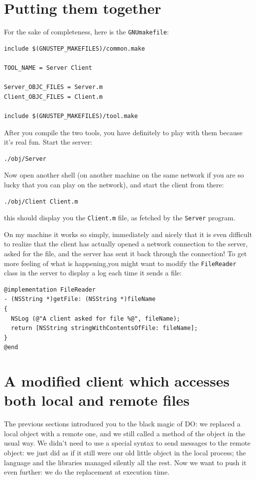 \documentclass[a4paper]{article}
\begin{document}
\section{Putting them together}
For the sake of completeness, here is the \texttt{GNUmakefile}:
\begin{verbatim}
include $(GNUSTEP_MAKEFILES)/common.make

TOOL_NAME = Server Client

Server_OBJC_FILES = Server.m
Client_OBJC_FILES = Client.m

include $(GNUSTEP_MAKEFILES)/tool.make
\end{verbatim}
After you compile the two tools, you have definitely to play with them
because it's real fun.  Start the server:
\begin{verbatim}
./obj/Server
\end{verbatim}
Now open another shell (on another machine on the same network if you
are so lucky that you can play on the network), and start the client
from there:
\begin{verbatim}
./obj/Client Client.m
\end{verbatim}
this should display you the \texttt{Client.m} file, as fetched by the
\texttt{Server} program.

On my machine it works so simply, immediately and nicely that it is
even difficult to realize that the client has actually opened a
network connection to the server, asked for the file, and the server
has sent it back through the connection!  To get more feeling of what
is happening,you might want to modify the \texttt{FileReader} class in
the server to display a log each time it sends a file:
\begin{verbatim}
@implementation FileReader
- (NSString *)getFile: (NSString *)fileName
{
  NSLog (@"A client asked for file %@", fileName);
  return [NSString stringWithContentsOfFile: fileName];
}
@end
\end{verbatim}

\section{A modified client which accesses both local and remote files}
The previous sections introduced you to the black magic of DO: we
replaced a local object with a remote one, and we still called a
method of the object in the usual way.  We didn't need to use a
special syntax to send messages to the remote object: we just did as
if it still were our old little object in the local process; the
language and the libraries managed silently all the rest.  Now we want
to push it even further: we do the replacement at execution time.
\end{document}
